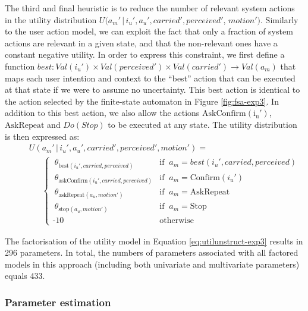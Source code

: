 The third and final heuristic is to reduce the number of relevant system actions in the utility distribution $U(a_m' \, | \,  i_u', a_u', \mathit{carried}', \mathit{perceived}'$, $\mathit{motion'})$.  Similarly to the user action model, we can exploit the fact that only a fraction of system actions are relevant in a given state, and that the non-relevant ones have a constant negative utility. In order to express this constraint, we first define a function $best: \mathit{Val}(i_u') \times \mathit{Val}(\mathit{perceived}') \times \mathit{Val}(\mathit{carried}') \rightarrow \mathit{Val}(a_m)$ that maps each user intention and context to the ``best'' action that can be executed at that state if we were to assume no uncertainty. This best action is identical to the action selected by the finite-state automaton in Figure \ref{fig:fsa-exp3}. In addition to this best action, we also allow the actions $\mathrm{AskConfirm(i_u')}$, $\mathrm{AskRepeat}$ and $Do(Stop)$ to be executed at any state. The utility distribution is then expressed as: 
\begin{align}
&&& U(a_m' \, | \, i_u', a_u', \mathit{carried}', \mathit{perceived}', \mathit{motion'}) = \nonumber \\
&&& \ \ \ \ \ \ \  \begin{cases} \ \theta_{\text{best}(i_u', \mathit{carried}, \mathit{perceived})} & \text{if } \ a_m = best(i_u', \mathit{carried}, \mathit{perceived}) \\ 
\ \theta_{\text{askConfirm}(i_u', \mathit{carried}, \mathit{perceived})} & \text{if } \ a_m = \mathrm{Confirm}(i_u') \\
\ \theta_{\text{askRepeat}(a_u, \mathit{motion'})} & \text{if } \ a_m = \mathrm{AskRepeat} \\
\ \theta_{\text{stop}(a_u,\mathit{motion'})} & \text{if } \ a_m = \mathrm{Stop} \\ 
\mbox{-}10 & \text{otherwise}
\end{cases} \label{eq:utilunstruct-exp3}
\end{align}

The factorisation of the utility model in Equation \eqref{eq:utilunstruct-exp3} results in 296 parameters. In total, the numbers of parameters associated with all factored models in this approach (including both univariate and multivariate parameters) equals 433.

\subsubsection*{Parameter estimation}

